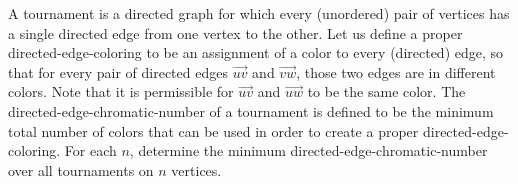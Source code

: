 A tournament is a directed graph for which every (unordered) pair of vertices has a single directed edge from one vertex to the other. Let us define a proper directed-edge-coloring to be an assignment of a color to every (directed) edge, so that for every pair of directed edges $\overrightarrow{uv}$ and $\overrightarrow{vw}$, those two edges are in different colors. Note that it is permissible for $\overrightarrow{uv}$ and $\overrightarrow{uw}$ to be the same color. The directed-edge-chromatic-number of a tournament is defined to be the minimum total number of colors that can be used in order to create a proper directed-edge-coloring. For each $n$, determine the minimum directed-edge-chromatic-number over all tournaments on $n$ vertices.